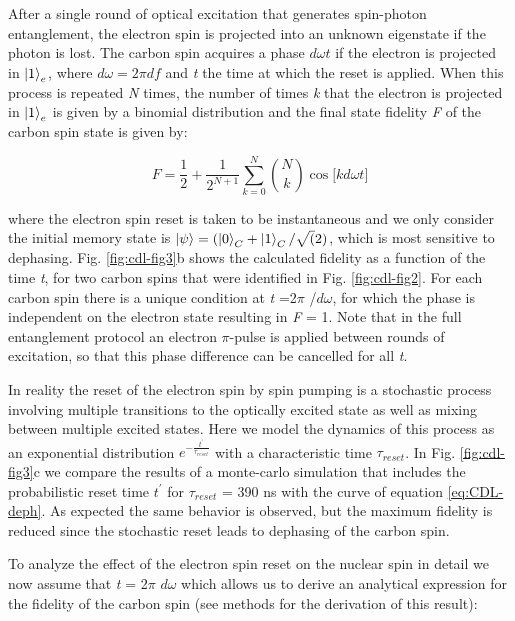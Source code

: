 After a single round of optical excitation that generates spin-photon entanglement, the electron spin is projected into an unknown eigenstate if the photon is lost. The carbon spin acquires a phase $d \omega t$ if the electron is projected in $\left|1\right>_e$, where $d \omega = 2 \pi df$ and \textit{t} the time at which the reset is applied. When this process is repeated \textit{N} times, the number of times \textit{k} that the electron is projected in $\left|1\right>_e$ is given by a binomial distribution and the final state fidelity \textit{F} of the carbon spin state is given by:

\begin{equation}\label{eq:CDL-deph}
F = \frac{1}{2} + \frac{1}{2^{N+1}} \sum_{k=0}^{N} \binom{N}{k} \cos \lbrack k d \omega t \rbrack
\end{equation}

where the electron spin reset is taken to be instantaneous and we only consider the initial memory state is $\left|\psi\right> = (\left|0\right>_C + \left|1\right>_C/\sqrt(2)$, which is most sensitive to dephasing. Fig. \ref{fig:cdl-fig3}b shows the calculated fidelity as a function of the time \textit{t}, for two carbon spins that were identified in Fig. \ref{fig:cdl-fig2}. For each carbon spin there is a unique condition at \textit{t} =2$\pi$ /$d \omega$, for which the phase is independent on the electron state resulting in \textit{F} = 1. Note that in the full entanglement protocol\cite{Bernien_Nature_2013,Barrett_Phys.Rev.A_2005} an electron $\pi$-pulse is applied between rounds of excitation, so that this phase difference can be cancelled for all \textit{t}. 


In reality the reset of the electron spin by spin pumping is a stochastic process involving multiple transitions to the optically excited state as well as mixing between multiple excited states. Here we model the dynamics of this process as an exponential distribution  $e^{- \frac{ t^{\prime} } {\tau_{reset} } }$  with a characteristic time $\tau_{reset}$.  In Fig. \ref{fig:cdl-fig3}c we compare the results of a monte-carlo simulation that includes the probabilistic reset time $t^{\prime}$ for $\tau_{reset}$ = 390 ns with the curve of equation \ref{eq:CDL-deph}. As expected the same behavior is observed, but the maximum fidelity is reduced since the stochastic reset leads to dephasing of the carbon spin. 

To analyze the effect of the electron spin reset on the nuclear spin in detail we now assume that  \textit{t} = 2$\pi$ $d\omega$ which allows us to derive an analytical expression for the fidelity of the carbon spin (see methods for the derivation of this result): 


